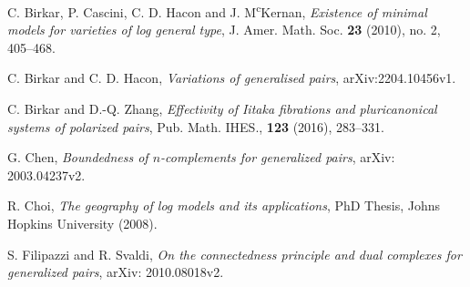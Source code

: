\documentclass[11pt]{amsart}
\numberwithin{equation}{section}
\theoremstyle{definition}
\theoremstyle{definition}
\theoremstyle{definition}
\begin{document}
\begin{thebibliography}{99}
C. Birkar, P. Cascini, C. D. Hacon and J. M\textsuperscript{c}Kernan, \textit{Existence of minimal models for varieties of log general type}, J. Amer. Math. Soc. \textbf{23} (2010), no. 2, 405--468.


 C. Birkar and C. D. Hacon, \textit{Variations of generalised pairs}, arXiv:2204.10456v1.


 C. Birkar and D.-Q. Zhang, \textit{Effectivity of Iitaka fibrations and pluricanonical systems of polarized pairs}, Pub. Math. IHES., \textbf{123} (2016), 283--331.

 G. Chen, \textit{Boundedness of $n$-complements for generalized pairs}, arXiv: 2003.04237v2.



 R. Choi, \textit{The geography of log models and its applications}, PhD Thesis, Johns Hopkins University (2008).







 S. Filipazzi and R. Svaldi, \textit{On the connectedness principle and dual complexes for generalized pairs}, arXiv: 2010.08018v2.


\end{thebibliography}
\end{document}
